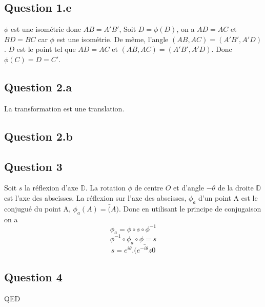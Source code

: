 \documentclass[]{book}
\theoremstyle{definition}
\newcommand{\bb}[1]{\mathbb{#1}}
\newcommand{\D}{\bb{D}}
\begin{document}
\subsection*{Question 1.e}
$\phi$ est une isom\'etrie donc $AB = A'B'$, Soit $D = \phi(D)$, on a $AD = AC$ et $BD = BC$ car $\phi$ est une isom\'etrie.
De m\^eme, l'angle $(AB, AC) = (A'B', A'D)$. $D$ est le point tel que $AD=AC$ et  $(AB, AC) = (A'B', A'D)$. Donc $\phi(C)=D=C'$.

\subsection*{Question 2.a}
La transformation est une translation.

\subsection*{Question 2.b}

\subsection*{Question 3}
Soit $s$ la r\'eflexion d'axe $\D$.
La rotation $\phi$ de centre $O$ et d'angle $-\theta$ de la droite $\D$ est l'axe des abscisses. La r\'eflexion sur l'axe des abscisses, $\phi_a$  d'un point A est le conjugu\'e du point A, $\phi_a(A) = \bar(A)$. Donc en utilisant le principe de conjugaison on a 
$$\phi_a = \phi \circ s \circ \phi^{-1}$$
$$\phi^{-1} \circ \phi_a \circ \phi = s$$
$$s = e^{i\theta}.\bar{(e^{-i\theta}z0}$$

\subsection*{Question 4}
 





QED
\end{document}
